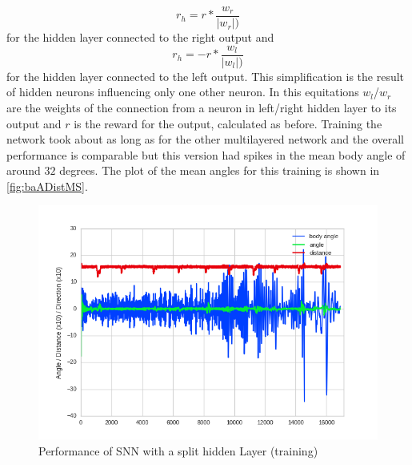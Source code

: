 \begin{equation}
r_h = r * \frac{w_r} {|w_r|)}
\end{equation}
for the hidden layer connected to the right output and
\begin{equation}
r_h = - r * \frac{w_l} {|w_l|)}
\end{equation}
for the hidden layer connected to the left output. This simplification is the result of hidden neurons influencing only one other neuron. In this equitations $w_l$/$w_r$ are the weights of the connection from a neuron in left/right hidden layer to its output and $r$ is the reward for the output, calculated as before.
Training the network took about as long as for the other multilayered network and the overall performance is comparable but this version had spikes in the mean body angle of around $32$ degrees. The plot of the mean angles for this training is shown in \autoref{fig:baADistMS}.
\begin{figure}[htpb]
  \centering
  \includegraphics[width=\textwidth]{figures/plots/newPlots/m2-train_perf}%
  \caption{ Performance of SNN with a split hidden Layer (training)  }
  \label{fig:baADistMS}
\end{figure}

